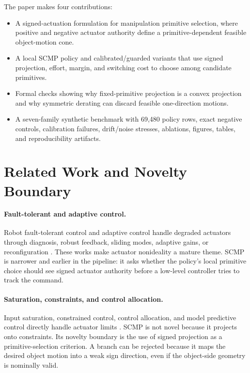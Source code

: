 \documentclass{article}
\begin{document}
The paper makes four contributions:
\begin{itemize}
\item A signed-actuation formulation for manipulation primitive selection, where positive and negative actuator authority define a primitive-dependent feasible object-motion cone.
\item A local SCMP policy and calibrated/guarded variants that use signed projection, effort, margin, and switching cost to choose among candidate primitives.
\item Formal checks showing why fixed-primitive projection is a convex projection and why symmetric derating can discard feasible one-direction motions.
\item A seven-family synthetic benchmark with 69,480 policy rows, exact negative controls, calibration failures, drift/noise stresses, ablations, figures, tables, and reproducibility artifacts.
\end{itemize}

\section{Related Work and Novelty Boundary}

\paragraph{Fault-tolerant and adaptive control.}
Robot fault-tolerant control and adaptive control handle degraded actuators through diagnosis, robust feedback, sliding modes, adaptive gains, or reconfiguration \citep{fault,adaptive,robust,constraints}. These works make actuator nonideality a mature theme. SCMP is narrower and earlier in the pipeline: it asks whether the policy's local primitive choice should see signed actuator authority before a low-level controller tries to track the command.

\paragraph{Saturation, constraints, and control allocation.}
Input saturation, constrained control, control allocation, and model predictive control directly handle actuator limits \citep{saturation,mpc,allocation,underactuated}. SCMP is not novel because it projects onto constraints. Its novelty boundary is the use of signed projection as a primitive-selection criterion. A branch can be rejected because it maps the desired object motion into a weak sign direction, even if the object-side geometry is nominally valid.
\end{document}
